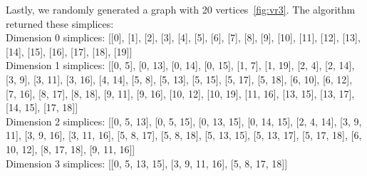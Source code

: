 \documentclass{article}
\begin{document}
Lastly, we randomly generated a graph with 20 vertices~\ref{fig:vr3}. The algorithm returned these simplices:\\
Dimension 0 simplices: [[0], [1], [2], [3], [4], [5], [6], [7], [8], [9], [10], [11], [12], [13], [14], [15], [16], [17], [18], [19]]\\
Dimension 1 simplices: [[0, 5], [0, 13], [0, 14], [0, 15], [1, 7], [1, 19], [2, 4], [2, 14], [3, 9], [3, 11], [3, 16], [4, 14], [5, 8], [5, 13], [5, 15], [5, 17], [5, 18], [6, 10], [6, 12], [7, 16], [8, 17], [8, 18], [9, 11], [9, 16], [10, 12], [10, 19], [11, 16], [13, 15], [13, 17], [14, 15], [17, 18]]\\
Dimension 2 simplices: [[0, 5, 13], [0, 5, 15], [0, 13, 15], [0, 14, 15], [2, 4, 14], [3, 9, 11], [3, 9, 16], [3, 11, 16], [5, 8, 17], [5, 8, 18], [5, 13, 15], [5, 13, 17], [5, 17, 18], [6, 10, 12], [8, 17, 18], [9, 11, 16]]\\
Dimension 3 simplices: [[0, 5, 13, 15], [3, 9, 11, 16], [5, 8, 17, 18]]
\end{document}
